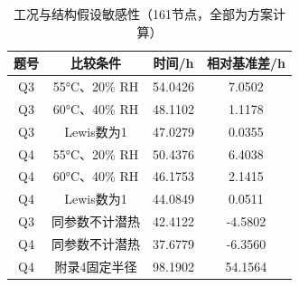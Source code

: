 \begin{table}[htbp]
  \centering
  \caption{工况与结构假设敏感性（161节点，全部为方案计算）}
  \label{tab:sensitivity}
  \begin{tabular}{cccc}
    \toprule
    题号 & 比较条件 & 时间/h & 相对基准差/h \\
    \midrule
    Q3 & 55°C、20\% RH & 54.0426 & 7.0502 \\
    Q3 & 60°C、40\% RH & 48.1102 & 1.1178 \\
    Q3 & Lewis数为1 & 47.0279 & 0.0355 \\
    Q4 & 55°C、20\% RH & 50.4376 & 6.4038 \\
    Q4 & 60°C、40\% RH & 46.1753 & 2.1415 \\
    Q4 & Lewis数为1 & 44.0849 & 0.0511 \\
    Q3 & 同参数不计潜热 & 42.4122 & -4.5802 \\
    Q4 & 同参数不计潜热 & 37.6779 & -6.3560 \\
    Q4 & 附录4固定半径 & 98.1902 & 54.1564 \\
    \bottomrule
  \end{tabular}
\end{table}
